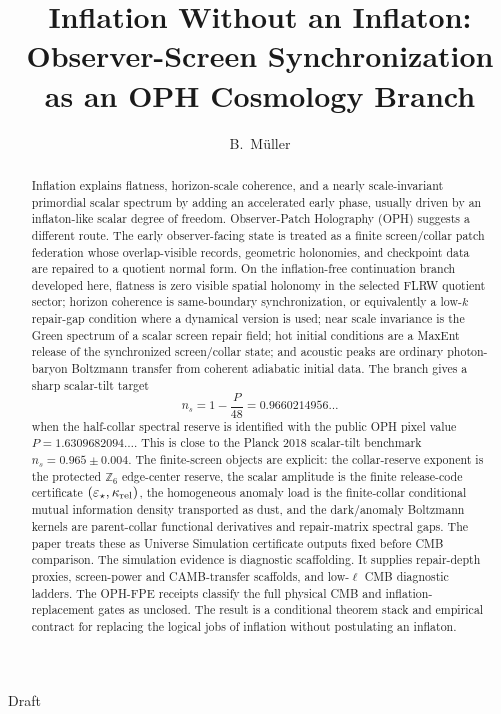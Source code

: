 \documentclass[11pt]{article}
\title{Inflation Without an Inflaton:\\
Observer-Screen Synchronization as an OPH Cosmology Branch}
\author{B.\ M\"uller}
\date{\OPHPaperReleaseDate}
\newcommand{\OPHPaperReleaseBanner}{Draft}
\newcommand{\Zsix}{\mathbb Z_6}
\begin{document}
\maketitle
\OPHPaperReleaseBanner

\begin{abstract}
Inflation explains flatness, horizon-scale coherence, and a nearly scale-invariant primordial
scalar spectrum by adding an accelerated early phase, usually driven by an inflaton-like scalar
degree of freedom. Observer-Patch Holography (OPH) suggests a different route. The early
observer-facing state is treated as a finite screen/collar patch federation whose overlap-visible
records, geometric holonomies, and checkpoint data are repaired to a quotient normal form. On the
inflation-free continuation branch developed here, flatness is zero visible spatial holonomy in the
selected FLRW quotient sector; horizon coherence is same-boundary synchronization, or equivalently a
low-\(k\) repair-gap condition where a dynamical version is used; near scale invariance is the
Green spectrum of a scalar screen repair field; hot initial conditions are a MaxEnt release of the
synchronized screen/collar state; and acoustic peaks are ordinary photon-baryon Boltzmann transfer
from coherent adiabatic initial data. The branch gives a sharp scalar-tilt target
\[
n_s=1-\frac{P}{48}=0.9660214956\ldots
\]
when the half-collar spectral reserve is identified with the public OPH pixel value
\(P=1.6309682094\ldots\). This is close to the Planck 2018 scalar-tilt benchmark
\(n_s=0.965\pm0.004\). The finite-screen objects are explicit: the collar-reserve
exponent is the protected \(\Zsix\) edge-center reserve, the scalar amplitude is the finite
release-code certificate \((\varepsilon_\star,\kappa_{\rm rel})\), the homogeneous anomaly load is the finite-collar conditional mutual
information density transported as dust, and the dark/anomaly Boltzmann kernels are parent-collar
functional derivatives and repair-matrix spectral gaps. The paper treats these as Universe
Simulation certificate outputs fixed before CMB comparison. The simulation evidence is diagnostic
scaffolding. It supplies repair-depth proxies,
screen-power and CAMB-transfer scaffolds, and low-\(\ell\) CMB diagnostic ladders. The OPH-FPE
receipts classify the full physical CMB and inflation-replacement gates as unclosed. The result is a
conditional theorem stack and empirical contract for replacing the logical jobs of inflation without
postulating an inflaton.
\end{abstract}
\end{document}
